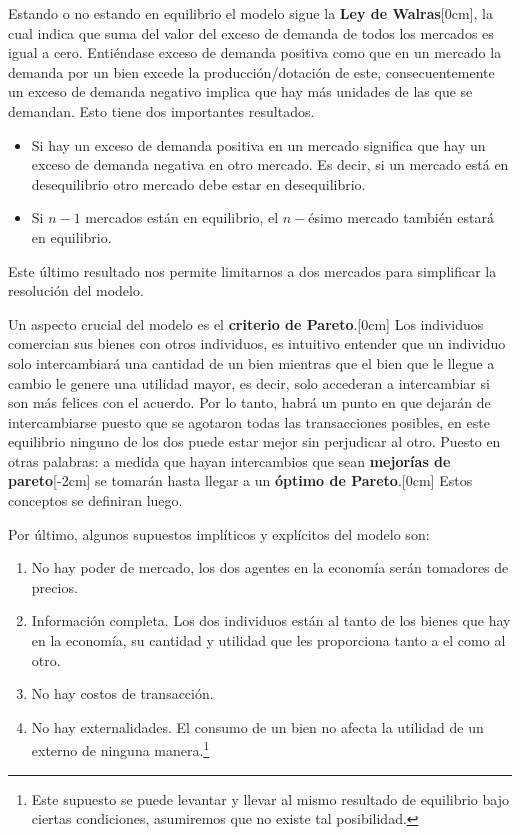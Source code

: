 Estando o no estando en equilibrio el modelo sigue la \textbf{Ley de Walras}[0cm], la cual indica que suma del valor del exceso de demanda de todos los mercados es igual a cero. Entiéndase exceso de demanda positiva como que en un mercado la demanda por un bien excede la producción/dotación de este, consecuentemente un exceso de demanda negativo implica que hay más unidades de las que se demandan. Esto tiene dos importantes resultados.
\begin{itemize}
    \item Si hay un exceso de demanda positiva en un mercado significa que hay un exceso de demanda negativa en otro mercado. Es decir, si un mercado está en desequilibrio otro mercado debe estar en desequilibrio.
    \item Si $n-1$ mercados están en equilibrio, el $n-$ésimo mercado también estará en equilibrio. 
\end{itemize}
Este último resultado nos permite limitarnos a dos mercados para simplificar la resolución del modelo.

Un aspecto crucial del modelo es el \textbf{criterio de Pareto}.[0cm] Los individuos comercian sus bienes con otros individuos, es intuitivo entender que un individuo solo intercambiará una cantidad de un bien mientras que el bien que le llegue a cambio le genere una utilidad mayor, es decir, solo accederan a intercambiar si son más felices con el acuerdo. Por lo tanto, habrá un punto en que dejarán de intercambiarse puesto que se agotaron todas las transacciones posibles, en este equilibrio ninguno de los dos puede estar mejor sin perjudicar al otro. Puesto en otras palabras: a medida que hayan intercambios que sean \textbf{mejorías de pareto}[-2cm] se tomarán hasta llegar a un \textbf{óptimo de Pareto}.[0cm] Estos conceptos se definiran luego.

Por último, algunos supuestos implíticos y explícitos del modelo son:
\begin{enumerate}
    \item No hay poder de mercado, los dos agentes en la economía serán tomadores de precios. 
    \item Información completa. Los dos individuos están al tanto de los bienes que hay en la economía, su cantidad y utilidad que les proporciona tanto a el como al otro. 
    \item No hay costos de transacción. 
    \item No hay externalidades. El consumo de un bien no afecta la utilidad de un externo de ninguna manera.\footnote{Este supuesto se puede levantar y llevar al mismo resultado de equilibrio bajo ciertas condiciones, asumiremos que no existe tal posibilidad.} 
\end{enumerate}

